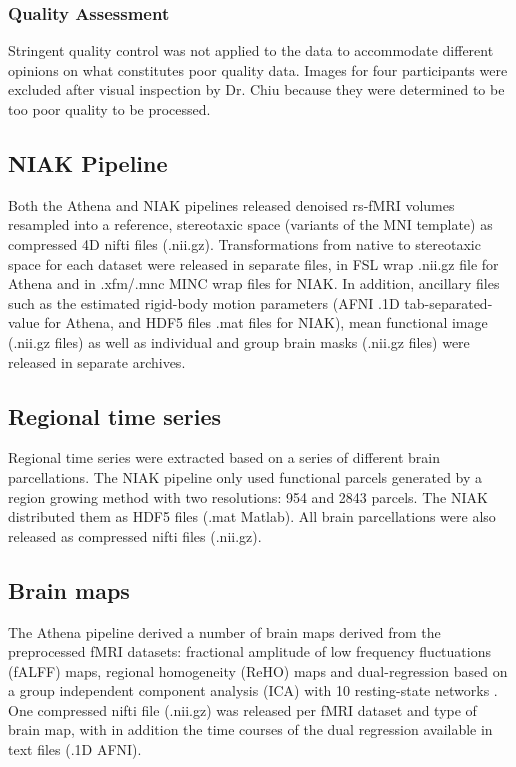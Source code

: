 \documentclass[preprint,12pt,5p]{elsarticle}
\begin{document}
\begin{itemize}
\subsubsection{Quality Assessment}
Stringent quality control was not applied to the data to accommodate different opinions on what constitutes poor quality data. Images for four participants were excluded after visual inspection by Dr. Chiu because they were determined to be too poor quality to be processed.

\subsection{NIAK Pipeline}

Both the Athena and NIAK pipelines released denoised rs-fMRI volumes resampled into a reference, stereotaxic space (variants of the MNI template) as compressed 4D nifti files (.nii.gz). Transformations from native to stereotaxic space for each dataset were released in separate files, in FSL wrap .nii.gz file for Athena and in .xfm/.mnc MINC wrap files for NIAK. In addition, ancillary files such as the estimated rigid-body motion parameters (AFNI .1D tab-separated-value for Athena, and HDF5 files .mat files for NIAK), mean functional image (.nii.gz files) as well as individual and group brain masks (.nii.gz files) were released in separate archives. 

\subsection{Regional time series} Regional time series were extracted based on a series of different brain parcellations. The NIAK pipeline only used functional parcels generated by a region growing method \cite{bellec2006identification} with two resolutions: 954 and 2843 parcels. The  NIAK distributed them as HDF5 files (.mat Matlab). All brain parcellations were also released as compressed nifti files (.nii.gz). 

\subsection{Brain maps}
The Athena pipeline derived a number of brain maps derived from the preprocessed fMRI datasets: fractional amplitude of low frequency fluctuations (fALFF) maps, regional homogeneity (ReHO) maps and dual-regression based on a group independent component analysis (ICA) with 10 resting-state networks \citep{smith2009correspondence}. One compressed nifti file (.nii.gz) was released per fMRI dataset and type of brain map, with in addition the time courses of the dual regression available in text files (.1D AFNI).




\end{itemize}
\end{document}
